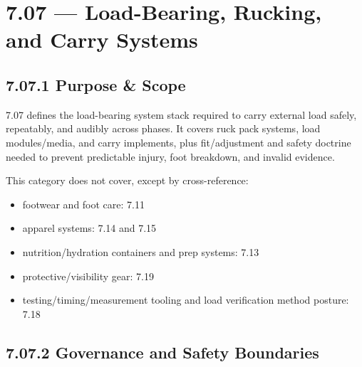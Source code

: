 \documentclass[10pt]{article}
\begin{document}
\section*{7.07 — Load-Bearing, Rucking, and Carry Systems}
{}

\subsection*{7.07.1 Purpose \& Scope}
{}

7.07 defines the load-bearing system stack required to carry external load safely, repeatably, and audibly across phases. It covers ruck pack systems, load modules/media, and carry implements, plus fit/adjustment and safety doctrine needed to prevent predictable injury, foot breakdown, and invalid evidence.

This category does not cover, except by cross-reference:

\begin{itemize}
\item footwear and foot care: 7.11
\item apparel systems: 7.14 and 7.15
\item nutrition/hydration containers and prep systems: 7.13
\item protective/visibility gear: 7.19
\item testing/timing/measurement tooling and load verification method posture: 7.18
\end{itemize}

\subsection*{7.07.2 Governance and Safety Boundaries}
{}
\end{document}
